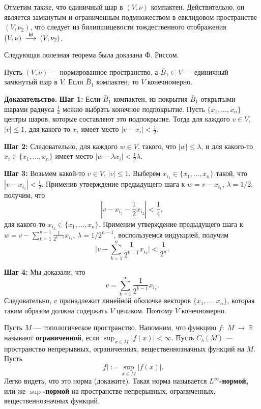 \documentclass[12pt]{book}
\newcommand{\arrow}{{\:\longrightarrow\:}}
\def\endproof{\hbox{\vrule width 5pt height 5pt depth 0pt}}
\def\Id{{\operatorname{\sf Id}}}
\def\R{{\mathbb R}}
\theoremstyle{upshape}
\theoremstyle{generic}
\theoremstyle{upshapenonumber}
\newcommand{\следствие}{%
     \refstepcounter{teorema}
     {\noindent\bf Следствие \thechapter.\arabic{teorema}:\ }}
\newcommand{\пример}{%
     \refstepcounter{teorema}
     {\noindent\bf Пример \thechapter.\arabic{teorema}:\ }}
\newcommand{\лемма}{%
     \refstepcounter{teorema}
     {\noindent\bf Лемма \thechapter.\arabic{teorema}:\ }}
\newcommand{\теорема}{%
     \refstepcounter{teorema}
     {\noindent\bf Теорема \thechapter.\arabic{teorema}:\ }}
\newcommand{\утверждение}{%
     \refstepcounter{teorema}
     {\noindent\bf Утверждение \thechapter.\arabic{teorema}:\ }}
\def\хфилл{\hfill}
\def\ноиндент{\noindent}
\def\бф{\bf}
\begin{document}
\хфилл

Отметим также, что единичный шар в $(V, \nu)$
компактен. Действительно, он является замкнутым
и ограниченным подмножеством в евклидовом пространстве $(V, \nu_2)$,
что следует из билипшицевости тождественного
отображения $(V, \nu)\stackrel {\Id}\arrow (V, \nu_2)$.

\хфилл


Следующая полезная теорема была доказана Ф. Риссом.

\хфилл

Пусть $(V,\nu)$ --- нормированное пространство,
а $\bar B_1\subset V$ --- единичный замкнутый шар в $V$.
Если $\bar B_1$ компактен, то $V$ конечномерно.

\хфилл

\ноиндент
{\бф Доказательство.} {\bf Шаг 1:}
Если $\bar B_1$ компактен, из
покрытия $\bar B_1$ открытыми шарами радиуса $\frac 1 2$ можно 
выбрать конечное подпокрытие. Пусть $\{x_1, ..., x_n\}$
центры шаров, которые составляют это подпокрытие.
Тогда для каждого $v\in V$, $|v|\leq 1$, для какого-то
$x_i$ имеет место $|v-x_i|< \frac 1 2$.

\хфилл

\ноиндент
{\bf Шаг 2:}
Следовательно, для каждого $w\in V$, такого, что 
$|w|\leq \lambda$, и для какого-то $x_i\in \{x_1, ..., x_n\}$ 
имеет место $|w-\lambda x_i|< \frac 1 2\lambda$.


\хфилл

\ноиндент
{\bf Шаг 3:} Возьмем какой-то $v\in V$, $|v|\leq 1$.
Выберем $x_{i_1}\in \{x_1, ..., x_n\}$ такой, что
$|v-x_{i_1}|< \frac 1 2$. Применив утверждение
предыдущего шага к $w=v-x_{i_1}$, $\lambda=1/2$,
получим, что
\[ |v-x_{i_1}-\frac 1 2 x_{i_2}| < \frac 1 4,
\]
для какого-то $x_{i_2}\in \{x_1, ..., x_n\}$.
Применим утверждение предыдущего шага 
к $w =v- \sum_{k=1}^{n-1} \frac 1 {2^{k-1}} x_{i_k}$, $\lambda=1/2^{n-1}$,
воспользуемся индукцией, получим
\[
\bigg | v- \sum_{k=1}^n \frac 1 {2^{k-1}} x_{i_k}\bigg| <
\frac 1 {2^n}.
\]

\хфилл

\ноиндент
{\bf Шаг 4:} Мы доказали, что 
\[ v = \sum_{k=1}^\infty \frac 1 {2^{k-1}} x_{i_k}. 
\]
Следовательно, $v$ принадлежит линейной оболочке
векторов $\{x_1, ..., x_n\}$, которая таким образом
должна содержать $V$ целиком. Поэтому $V$ конечномерно.
\endproof

\хфилл

Пусть $M$ --- топологическое пространство.
Напомним, что функцию $f:\; M \arrow \R$ называют
{\бф ограниченной}, если $\sup_{x\in M} |f(x)| < \infty$.
Пусть $C_b(M)$ --- пространство непрерывных, ограниченных,
вещественнозначных функций на $M$. Пусть
\[ |f|:= \sup_{x\in M} |f(x)|.\]
Легко видеть, что это норма (докажите). 
Такая норма называется {\бф $L^\infty$-нормой,}
или же {\бф $\sup$-нормой} на пространстве
непрерывных, ограниченных,
вещественнозначных функций. 
\end{document}
